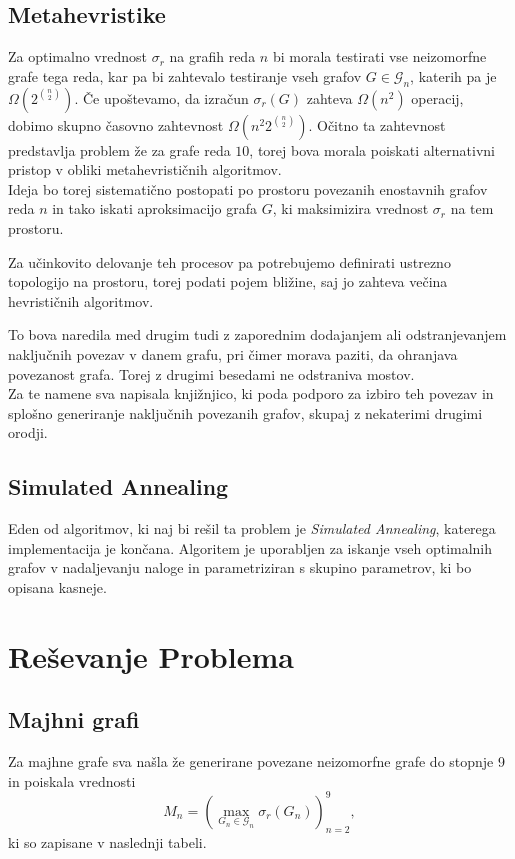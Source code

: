\documentclass[ letterpaper, titlepage, fleqn]{article}
\begin{document}
\subsection{Metahevristike}
Za optimalno vrednost $\sigma_r$ na grafih reda $n$ bi morala testirati vse neizomorfne
grafe tega reda, kar pa bi zahtevalo testiranje vseh grafov $G \in \mathscr{G}_n$, 
katerih pa je $\Omega\left(2^{\binom{n}{2}}\right)$. Če upoštevamo, da izračun $\sigma_r(G)$ 
zahteva $\Omega(n^2)$ operacij, dobimo skupno časovno zahtevnost $\Omega\left(n^2 2^{\binom{n}{2}}\right)$.
Očitno ta zahtevnost predstavlja problem že za grafe reda $10$, 
torej bova morala poiskati alternativni pristop v obliki metahevrističnih algoritmov. \\

Ideja bo torej sistematično postopati po prostoru povezanih enostavnih grafov reda $n$ in 
tako iskati aproksimacijo grafa $G$, ki maksimizira vrednost $\sigma_r$ na tem prostoru.

Za učinkovito delovanje teh procesov pa potrebujemo definirati ustrezno topologijo 
na prostoru, torej podati pojem bližine, saj jo zahteva večina hevrističnih algoritmov.

To bova naredila med drugim tudi z zaporednim dodajanjem ali odstranjevanjem naključnih povezav v 
danem grafu, pri čimer morava paziti, da ohranjava povezanost grafa. 
Torej z drugimi besedami ne odstraniva mostov.\\
Za te namene sva napisala knjižnjico, ki poda podporo za izbiro teh povezav
in splošno generiranje naključnih povezanih grafov, skupaj z nekaterimi drugimi orodji.

\subsection{Simulated Annealing}
Eden od algoritmov, ki naj bi rešil ta problem je {\em Simulated Annealing}, 
katerega implementacija je končana.
Algoritem je uporabljen za iskanje vseh optimalnih grafov v nadaljevanju naloge in parametriziran
s skupino parametrov, ki bo opisana kasneje.

\section{Reševanje Problema}

\subsection{Majhni grafi}
Za majhne grafe sva našla že generirane povezane neizomorfne grafe do stopnje 9 in poiskala vrednosti 
$$M_n = (\max_{G_n \in \mathscr{G}_n} \sigma_r(G_n))_{n=2}^9,$$
ki so zapisane v naslednji tabeli.
\end{document}
